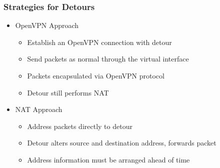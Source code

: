 \documentclass{beamer}
\begin{document}
\begin{frame}
  \frametitle{Strategies for Detours}

  \begin{itemize}
  \item OpenVPN Approach
    \begin{itemize}
    \item Establish an OpenVPN connection with detour
    \item Send packets as normal through the virtual interface
    \item Packets encapsulated via OpenVPN protocol
    \item Detour still performs NAT
    \end{itemize}
  \item NAT Approach
    \begin{itemize}
    \item Address packets directly to detour
    \item Detour alters source and destination address, forwards packet
    \item Address information must be arranged ahead of time
    \end{itemize}
  \end{itemize}
\end{frame}
\end{document}
